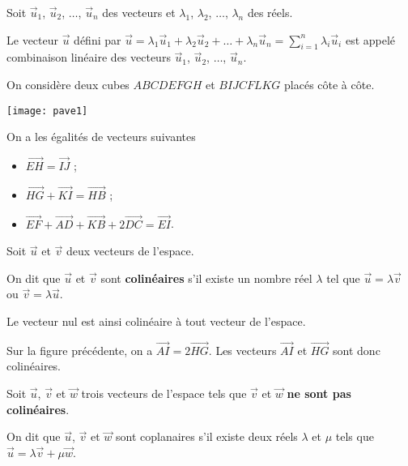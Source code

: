 \documentclass[11pt,fleqn, openany]{book} %
\begin{document}
\begin{definition} Soit $\vec u_1$, $ \vec u_2$, $\ldots$, $\vec u_n$ des vecteurs et $\lambda_1$, $\lambda_2$, $\ldots$, $\lambda_n$ des réels.

Le vecteur $\vec u$ défini par $\vec u = \lambda_1 \vec u_1 + \lambda_2 \vec u_2 + \ldots + \lambda_n \vec u_n = \displaystyle\sum_{i=1}^n \lambda_i \vec u_i$ est appelé combinaison linéaire des vecteurs $\vec u_1$, $\vec u_2$, $\ldots$, $\vec u_n$.\end{definition}
\begin{example}
On considère deux cubes $ABCDEFGH$ et $BIJCFLKG$ placés côte à côte.

\begin{minipage}{0.4\linewidth}
\texttt{[image: pave1]}

\end{minipage}
\begin{minipage}{0.55 \linewidth}
 On a les égalités de vecteurs suivantes
\begin{itemize}
\item $\overrightarrow{EH} = \overrightarrow{IJ}$ ;
\item $\overrightarrow{HG}+\overrightarrow{KI}= \overrightarrow{HB}$ ;
\item $\overrightarrow{EF}+\overrightarrow{AD}+\overrightarrow{KB}+2\overrightarrow{DC}=\overrightarrow{EI}$.
\end{itemize}
\end{minipage}

\end{example}


\begin{definition}Soit $\vec u$ et $\vec v$ deux vecteurs de l'espace.

On dit que $\vec u$ et $\vec v$ sont \textbf{colinéaires} s'il existe un nombre réel $\lambda$ tel que $\vec u = \lambda \vec v$ ou $\vec v = \lambda \vec u$.\end{definition}

Le vecteur nul est ainsi colinéaire à tout vecteur de l'espace.

\begin{example}Sur la figure précédente, on a $\overrightarrow{AI}=2\overrightarrow{HG}$. Les vecteurs $\overrightarrow{AI}$ et $\overrightarrow{HG}$ sont donc colinéaires.\end{example}

\newpage

\begin{definition}Soit $\vec u$, $\vec v$ et $\vec w$ trois vecteurs de l'espace tels que $\vec v$ et $\vec w$ \textbf{ne sont pas colinéaires}. 

On dit que $\vec u$, $\vec v$ et $\vec w$ sont coplanaires s'il existe deux réels $\lambda$ et $\mu$ tels que $\vec u = \lambda \vec v+ \mu \vec w$.\end{definition}
\end{document}
